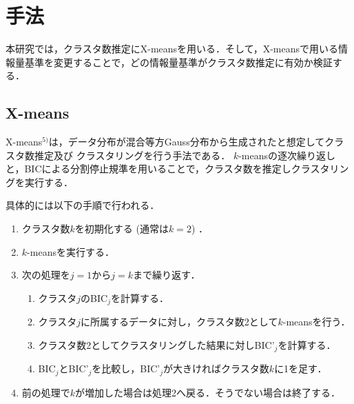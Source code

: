 \section{手法}

本研究では，クラスタ数推定にX-meansを用いる．そして，X-meansで用いる情報量基準を変更することで，どの情報量基準がクラスタ数推定に有効か検証する．

\subsection{X-means}
X-means$^{5)}$は，データ分布が混合等方Gauss分布から生成されたと想定してクラスタ数推定及び
クラスタリングを行う手法である．
$k$-meansの逐次繰り返しと，BICによる分割停止規準を用いることで，クラスタ数を推定しクラスタリングを実行する．

具体的には以下の手順で行われる．
\begin{enumerate}
    \item クラスタ数$k$を初期化する (通常は$k=2$) ．
    \item $k$-meansを実行する．
    \item 次の処理を$j=1$から$j=k$まで繰り返す．
    \begin{enumerate}
        \item クラスタ$j$のBIC$_j$を計算する．
        \item クラスタ$j$に所属するデータに対し，クラスタ数2として$k$-meansを行う．
        \item クラスタ数2としてクラスタリングした結果に対しBIC'$_j$を計算する．
        \item BIC$_j$とBIC'$_j$を比較し，BIC'$_j$が大きければクラスタ数$k$に1を足す．
    \end{enumerate}
    \item 前の処理で$k$が増加した場合は処理2へ戻る．そうでない場合は終了する．
\end{enumerate}

